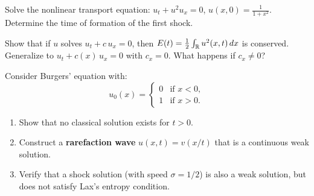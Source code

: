 \begin{exercise}
Solve the nonlinear transport equation:
$u_t + u^2 u_x = 0$, $u(x,0) = \frac{1}{1+x^2}$.
Determine the time of formation of the first shock.
\end{exercise}

\begin{exercise}
Show that if $u$ solves $u_t + c\, u_x = 0$, then
$E(t) = \frac{1}{2}\int_{\mathbb{R}} u^2(x,t)\, dx$ is conserved.
Generalize to $u_t + c(x)\, u_x = 0$ with $c_x = 0$.
What happens if $c_x \neq 0$?
\end{exercise}

\begin{exercise}
Consider Burgers' equation with:
\[
    u_0(x) = \begin{cases}
        0 & \text{if } x < 0,\\
        1 & \text{if } x > 0.
    \end{cases}
\]
\begin{enumerate}
    \item Show that no classical solution exists for $t > 0$.
    \item Construct a \textbf{rarefaction wave} $u(x,t) = v(x/t)$ that
          is a continuous weak solution.
    \item Verify that a shock solution (with speed $\sigma = 1/2$) is
          also a weak solution, but does not satisfy Lax's entropy
          condition.
\end{enumerate}
\end{exercise}
